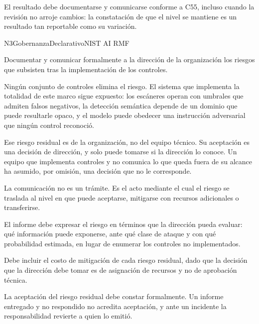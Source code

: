 El resultado debe documentarse y comunicarse conforme a C55, incluso cuando la revisión no arroje cambios: la constatación de que el nivel se mantiene es un resultado tan reportable como su variación.


  {N3}{Gobernanza}{Declarativo}{NIST AI RMF}

Documentar y comunicar formalmente a la dirección de la organización los riesgos que subsisten tras la implementación de los controles.

Ningún conjunto de controles elimina el riesgo. El sistema que implementa la totalidad de este marco sigue expuesto: los escáneres operan con umbrales que admiten falsos negativos, la detección semántica depende de un dominio que puede resultarle opaco, y el modelo puede obedecer una instrucción adversarial que ningún control reconoció.

Ese riesgo residual es de la organización, no del equipo técnico. Su aceptación es una decisión de dirección, y solo puede tomarse si la dirección lo conoce. Un equipo que implementa controles y no comunica lo que queda fuera de su alcance ha asumido, por omisión, una decisión que no le corresponde.

La comunicación no es un trámite. Es el acto mediante el cual el riesgo se traslada al nivel en que puede aceptarse, mitigarse con recursos adicionales o transferirse.

El informe debe expresar el riesgo en términos que la dirección pueda evaluar: qué información puede exponerse, ante qué clase de ataque y con qué probabilidad estimada, en lugar de enumerar los controles no implementados.

Debe incluir el costo de mitigación de cada riesgo residual, dado que la decisión que la dirección debe tomar es de asignación de recursos y no de aprobación técnica.

La aceptación del riesgo residual debe constar formalmente. Un informe entregado y no respondido no acredita aceptación, y ante un incidente la responsabilidad revierte a quien lo emitió.

